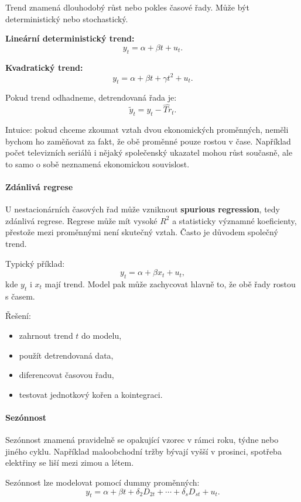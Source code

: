 Trend znamená dlouhodobý růst nebo pokles časové řady. Může být deterministický nebo stochastický.

\textbf{Lineární deterministický trend:}
\[
    y_t = \alpha + \beta t + u_t.
\]

\textbf{Kvadratický trend:}
\[
    y_t = \alpha + \beta t + \gamma t^2 + u_t.
\]

Pokud trend odhadneme, detrendovaná řada je:
\[
    \widetilde y_t = y_t - \widehat{Tr}_t.
\]

Intuice: pokud chceme zkoumat vztah dvou ekonomických proměnných, neměli bychom ho zaměňovat
za fakt, že obě proměnné pouze rostou v čase. Například počet televizních seriálů i nějaký společenský
ukazatel mohou růst současně, ale to samo o sobě neznamená ekonomickou souvislost.

\paragraph{Zdánlivá regrese}

U nestacionárních časových řad může vzniknout \textbf{spurious regression}, tedy zdánlivá regrese.
Regrese může mít vysoké $R^2$ a statisticky významné koeficienty, přestože mezi proměnnými není
skutečný vztah. Často je důvodem společný trend.

Typický příklad:
\[
    y_t = \alpha + \beta x_t + u_t,
\]
kde $y_t$ i $x_t$ mají trend. Model pak může zachycovat hlavně to, že obě řady rostou s časem.

Řešení:
\begin{itemize}
    \item zahrnout trend $t$ do modelu,
    \item použít detrendovaná data,
    \item diferencovat časovou řadu,
    \item testovat jednotkový kořen a kointegraci.
\end{itemize}

\paragraph{Sezónnost}

Sezónnost znamená pravidelně se opakující vzorec v rámci roku, týdne nebo jiného cyklu.
Například maloobchodní tržby bývají vyšší v prosinci, spotřeba elektřiny se liší mezi zimou a létem.

Sezónnost lze modelovat pomocí dummy proměnných:
\[
    y_t =
    \alpha+\beta t+\delta_2D_{2t}+\cdots+\delta_sD_{st}+u_t.
\]

